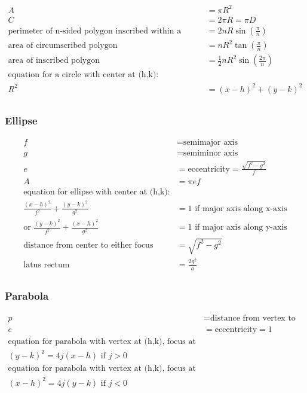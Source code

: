\documentclass[
]{book}
\begin{document}
\begin{align}
A &= \pi R^2 \\
C &= 2 \pi R = \pi D \\
\text{perimeter of n-sided polygon inscribed within a circle} &= 2 n R \sin \left(\frac{\pi}{n} \right) \\
\text{area of circumscribed polygon} &= n R^2 \tan \left( \frac{\pi}{n} \right) \\
\text{area of inscribed polygon} &= \frac{1}{2} n R^2 \sin \left( \frac{2\pi}{n} \right) \\
\text{equation for a circle with center at (h,k):} \\
R^2  &= \left(x-h \right)^2  + \left(y-k \right)^2 \\
\end{align}

\hypertarget{ellipse}{%
\subsubsection*{Ellipse}\label{ellipse}}

\begin{align}
f &= \text{semimajor axis} \\
g &= \text{semiminor axis} \\
e &= \text{eccentricity} = \frac{ \sqrt{f^2 -g^2} }{f} \\
A &= \pi e f \\
\text{equation for ellipse with center at (h,k):} \\
\frac{(x-h)^2 }{f^2}  + \frac{(y-k)^2}{g^2}  &= 1 \text{ if major axis along x-axis} \\
\text{or } \frac{(y-k)^2 }{f^2}  + \frac{(x-h)^2}{g^2}  &= 1 \text{ if major axis along y-axis} \\
\text{distance from center to either focus} &= \sqrt{f^2 -g^2} \\
\text{latus rectum} &= \frac{2g^2}{a} \\
\end{align}

\hypertarget{parabola}{%
\subsubsection*{Parabola}\label{parabola}}

\begin{align}
p &= \text{distance from vertex to focus} \\
e &= \text{eccentricity} = 1 \\
\text{equation for parabola with vertex at (h,k), focus at (h+p,k):} \\
(y-k)^2  = 4j(x-h) \text{ if } j > 0 \\
\text{equation for parabola with vertex at (h,k), focus at (h,k+p):} \\
(x-h)^2  = 4j(y-k) \text{ if } j < 0 \\
\end{align}
\end{document}
